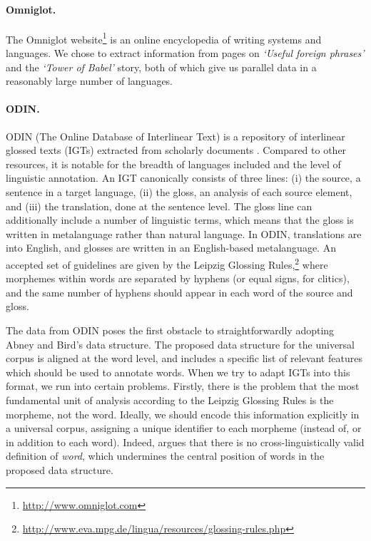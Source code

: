 \paragraph{Omniglot.}

The Omniglot website\footnote{\url{http://www.omniglot.com}} is an online encyclopedia of writing systems and languages. We chose to extract information from pages on \emph{`Useful foreign phrases'} and the \emph{`Tower of Babel'} story, both of which give us parallel data in a reasonably large number of languages. %

\paragraph{ODIN.} \label{sec:odin}

ODIN (The Online Database of Interlinear Text) is a repository of
interlinear glossed texts (IGTs) extracted from scholarly documents
\cite{lewis2006odin,lewis2010odin}.  Compared to other resources, it
is notable for the breadth of languages included and the level of
linguistic annotation.  An IGT canonically consists of three lines:
(i) the source, a sentence in a target language, (ii) the gloss, an
analysis of each source element, and (iii) the translation,
done at the sentence level. The gloss line can additionally include a
number of linguistic terms, which means that the gloss 
is written in metalanguage rather than natural language.  In ODIN, translations are into English, and glosses
are written in an English-based metalanguage.  An accepted set of
guidelines are given by the Leipzig Glossing
Rules,\footnote{\url{http://www.eva.mpg.de/lingua/resources/glossing-rules.php}}
where morphemes within words are separated by hyphens (or equal signs,
for clitics), and the same number of hyphens should appear in each
word of the source and gloss.

The data from ODIN poses the first obstacle to straightforwardly adopting Abney and Bird's data structure. 
The proposed data structure for the universal corpus is aligned at the word level, and includes a specific list of relevant features which should be used to annotate words. When we try to adapt IGTs into this format, we run into certain problems.  Firstly, there is the problem that the most fundamental unit of analysis according to the Leipzig Glossing Rules is the morpheme, not the word.  Ideally, we should encode this information explicitly in a universal corpus, assigning a unique identifier to each morpheme (instead of, or in addition to each word). Indeed,  argues that there is no cross-linguistically valid definition of \textit{word}, which undermines the central position of words in the proposed data structure.

